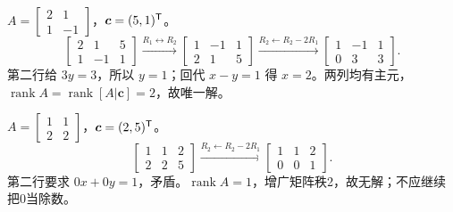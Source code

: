 \solve
{}\(A=\begin{bmatrix}2&1\\1&-1\end{bmatrix}\)，\(\bm c=(5,1)^{\mathsf T}\)。
\[
\left[\begin{array}{cc|c}2&1&5\\1&-1&1\end{array}\right]
\xrightarrow{R_1\leftrightarrow R_2}
\left[\begin{array}{cc|c}1&-1&1\\2&1&5\end{array}\right]
\xrightarrow{R_2\leftarrow R_2-2R_1}
\left[\begin{array}{cc|c}1&-1&1\\0&3&3\end{array}\right].
\]
第二行给 \(3y=3\)，所以 \(y=1\)；回代 \(x-y=1\) 得 \(x=2\)。两列均有主元，\(\operatorname{rank}A=\operatorname{rank}[A|\bm c]=2\)，故唯一解。

\(A=\begin{bmatrix}1&1\\2&2\end{bmatrix}\)，\(\bm c=(2,5)^{\mathsf T}\)。
\[
\left[\begin{array}{cc|c}1&1&2\\2&2&5\end{array}\right]
\xrightarrow{R_2\leftarrow R_2-2R_1}
\left[\begin{array}{cc|c}1&1&2\\0&0&1\end{array}\right].
\]
第二行要求 \(0x+0y=1\)，矛盾。\(\operatorname{rank}A=1\)，增广矩阵秩2，故无解；不应继续把0当除数。

